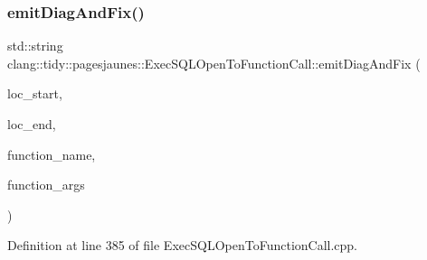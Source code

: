 \subsubsection{\texorpdfstring{emit\+Diag\+And\+Fix()}{emitDiagAndFix()}}
{\footnotesize\ttfamily std\+::string clang\+::tidy\+::pagesjaunes\+::\+Exec\+S\+Q\+L\+Open\+To\+Function\+Call\+::emit\+Diag\+And\+Fix (\begin{DoxyParamCaption}\item[{const Source\+Location \&}]{loc\+\_\+start,  }\item[{const Source\+Location \&}]{loc\+\_\+end,  }\item[{const std\+::string \&}]{function\+\_\+name,  }\item[{const std\+::string \&}]{function\+\_\+args }\end{DoxyParamCaption})}



Definition at line 385 of file Exec\+S\+Q\+L\+Open\+To\+Function\+Call.\+cpp.


